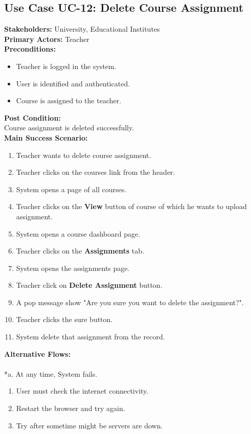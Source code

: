 \subsection{Use Case UC-12: Delete Course Assignment}
\textbf{Stakeholders: } University, Educational Institutes \\
\textbf{Primary Actors: }Teacher \\
\textbf{Preconditions:}
\begin{itemize}
\item Teacher is logged in the system.
\item User is identified and authenticated.
\item Course is assigned to the teacher.
\end{itemize}
\textbf{Post Condition: }\\
Course assignment is deleted successfully.\\
\textbf{Main Success Scenario:}
\begin{enumerate}
\item Teacher wants to delete course assignment.
\item Teacher clicks on the courses link from the header.
\item System opens a page of all courses.
\item Teacher clicks on the \textbf{View} button of course of which he wants to upload assignment.
\item System opens a course dashboard page.
\item Teacher clicks on the \textbf{Assignments} tab.
\item System opens the assignments page.
\item Teacher click on \textbf{Delete Assignment} button.
\item A pop message show "Are you sure you want to delete the assignment?".
\item Teacher clicks the sure button.
\item System delete that assignment from the record.
\end{enumerate}
\textbf{Alternative Flows:}\\
\\
*a. At any time, System fails.
\begin{enumerate}
\item User must check the internet connectivity.
\item Restart the browser and try again.
\item Try after sometime might be servers are down.
\end{enumerate}
